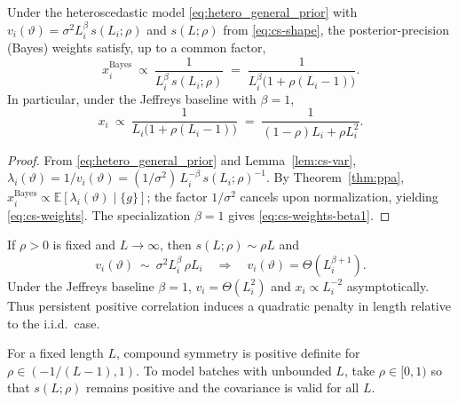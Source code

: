 \begin{proposition}\label{prop:cs-weights}
Under the heteroscedastic model \eqref{eq:hetero_general_prior} with
\(
v_i(\vartheta)=\sigma^2 L_i^{\beta}\,s(L_i;\rho)
\)
and $s(L;\rho)$ from \eqref{eq:cs-shape}, the posterior-precision (Bayes) weights satisfy, up to a common factor,
\begin{equation}
  x_i^{\mathrm{Bayes}}
  \ \propto\ 
  \frac{1}{L_i^{\beta}\,s(L_i;\rho)}
  \;=\;
  \frac{1}{L_i^{\beta}\big(1+\rho(L_i-1)\big)}.
  \label{eq:cs-weights}
\end{equation}
In particular, under the Jeffreys baseline with $\beta=1$,
\begin{equation}
  x_i \ \propto\ \frac{1}{L_i\big(1+\rho(L_i-1)\big)}
  \;=\; \frac{1}{(1-\rho)L_i + \rho L_i^2}.
  \label{eq:cs-weights-beta1}
\end{equation}
\end{proposition}

\begin{proof}
From \eqref{eq:hetero_general_prior} and Lemma~\ref{lem:cs-var},
\(
\lambda_i(\vartheta)=1/v_i(\vartheta)=(1/\sigma^2)\,L_i^{-\beta}\,s(L_i;\rho)^{-1}.
\)
By Theorem~\ref{thm:ppa}, $x_i^{\mathrm{Bayes}}\propto \mathbb{E}[\lambda_i(\vartheta)\mid\{g\}]$; the factor $1/\sigma^2$ cancels upon normalization, yielding \eqref{eq:cs-weights}. The specialization $\beta=1$ gives \eqref{eq:cs-weights-beta1}.
\end{proof}

\begin{corollary}\label{cor:cs-asymp}
If $\rho>0$ is fixed and $L\to\infty$, then $s(L;\rho)\sim \rho L$ and
\[
v_i(\vartheta)\ \sim\ \sigma^2 L_i^{\beta}\,\rho L_i
\quad\Longrightarrow\quad
v_i(\vartheta)=\Theta(L_i^{\beta+1}).
\]
Under the Jeffreys baseline $\beta=1$, $v_i=\Theta(L_i^2)$ and $x_i\propto L_i^{-2}$ asymptotically. Thus persistent positive correlation induces a quadratic penalty in length relative to the i.i.d.\ case.
\end{corollary}

\begin{remark}
For a fixed length $L$, compound symmetry is positive definite for $\rho\in(-1/(L-1),1)$. To model batches with unbounded $L$, take $\rho\in[0,1)$ so that $s(L;\rho)$ remains positive and the covariance is valid for all $L$.
\end{remark}


